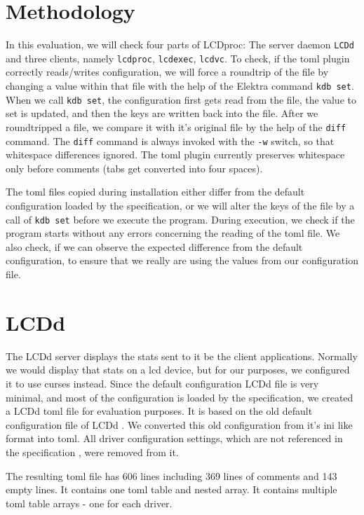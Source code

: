 \documentclass[12pt]{report}
\begin{document}
\section{Methodology}
In this evaluation, we will check four parts of LCDproc: The server daemon \texttt{LCDd} and three clients, namely \texttt{lcdproc}, \texttt{lcdexec}, \texttt{lcdvc}.
To check, if the \acrshort{toml} plugin correctly reads/writes configuration, we will force a roundtrip of the file by changing a value within that file with the help of the Elektra command \texttt{kdb set}.
When we call \texttt{kdb set}, the configuration first gets read from the file, the value to set is updated, and then the keys are written back into the file.
After we roundtripped a file, we compare it with it's original file by the help of the \texttt{diff} command.
The \texttt{diff} command is always invoked with the \texttt{-w} switch, so that whitespace differences ignored.
The \acrshort{toml} plugin currently preserves whitespace only before comments (tabs get converted into four spaces).

The \acrshort{toml} files copied during installation either differ from the default configuration loaded by the specification, or we will alter the keys of the file by a call of \texttt{kdb set} before we execute the program.
During execution, we check if the program starts without any errors concerning the reading of the \acrshort{toml} file.
We also check, if we can observe the expected difference from the default configuration, to ensure that we really are using the values from our configuration file.

\section{LCDd}
The LCDd server displays the stats sent to it be the client applications. Normally we would display that stats on a \acrshort{lcd} device, but for our purposes, we configured it to use curses instead.
Since the default configuration LCDd file is very minimal, and most of the configuration is loaded by the specification, we created a LCDd \acrshort{toml} file for evaluation purposes.
It is based on the old default configuration file of LCDd \cite{LCDprocconf}.
We converted this old configuration from it's ini like format into \acrshort{toml}.
All driver configuration settings, which are not referenced in the specification \cite{bauhaus93forklcdprocslcddspec}, were removed from it.

The resulting \acrshort{toml} file has 606 lines including 369 lines of comments and 143 empty lines.
It contains one \acrshort{toml} table and nested array.
It contains multiple \acrshort{toml} table arrays - one for each driver.
\end{document}
